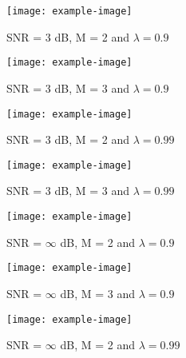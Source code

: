 \begin{figure}[!htp]
    \centering
    \texttt{[image: example-image]}
    \caption{SNR = 3 dB, M = 2 and $\lambda = 0.9$}
    \label{fig:L4Q3_a1}
\end{figure}

\begin{figure}[!htp]
    \centering
    \texttt{[image: example-image]}
    \caption{SNR = 3 dB, M = 3 and $\lambda = 0.9$}
    \label{fig:L4Q3_a2}
\end{figure}

\begin{figure}[!htp]
    \centering
    \texttt{[image: example-image]}
    \caption{SNR = 3 dB, M = 2 and $\lambda = 0.99$}
    \label{fig:L4Q3_a3}
\end{figure}

\begin{figure}[!htp]
    \centering
    \texttt{[image: example-image]}
    \caption{SNR = 3 dB, M = 3 and $\lambda = 0.99$}
    \label{fig:L4Q3_a4}
\end{figure}

\begin{figure}[!htp]
    \centering
    \texttt{[image: example-image]}
    \caption{SNR = $\infty$ dB, M = 2 and $\lambda = 0.9$}
    \label{fig:L4Q3_a5}
\end{figure}

\begin{figure}[!htp]
    \centering
    \texttt{[image: example-image]}
    \caption{SNR = $\infty$ dB, M = 3 and $\lambda = 0.9$}
    \label{fig:L4Q3_a6}
\end{figure}

\begin{figure}[!htp]
    \centering
    \texttt{[image: example-image]}
    \caption{SNR = $\infty$ dB, M = 2 and $\lambda = 0.99$}
    \label{fig:L4Q3_a7}
\end{figure}

